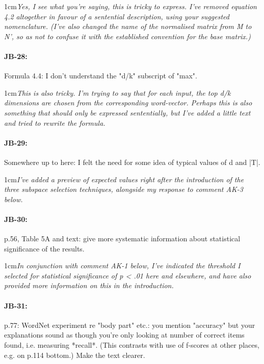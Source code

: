 \documentclass[11pt,a4paper]{article}
\newcommand{\res}[1]{\vspace{0.25cm} \begin{adjustwidth}{1cm}{}\emph{#1}\end{adjustwidth}}
\begin{document}
\res{Yes, I see what you're saying, this is tricky to express.  I've removed equation 4.2 altogether in favour of a sentential description, using your suggested nomenclature.  (I've also changed the name of the normalised matrix from M to N', so as not to confuse it with the established convention for the base matrix.)}

\paragraph{JB-28:} Formula 4.4: I don't understand the "d/k" subscript of "max".

\res{This is also tricky.  I'm trying to say that for each input, the top d/k dimensions are chosen from the corresponding word-vector.  Perhaps this is also something that should only be expressed sententially, but I've added a little text and tried to rewrite the formula.}

\paragraph{JB-29:} Somewhere up to here: I felt the need for some idea of typical values of d and |T|.

\res{I've added a preview of expected values right after the introduction of the three subspace selection techniques, alongside my response to comment AK-3 below.}

\paragraph{JB-30:} p.56, Table 5A and text: give more systematic information about statistical significance of the results.

\res{In conjunction with comment AK-1 below, I've indicated the threshold I selected for statistical significance of p < .01 here and elsewhere, and have also provided more information on this in the introduction.}

\paragraph{JB-31:} p.77: WordNet experiment re "body part" etc.: you mention "accuracy" but your explanations sound as though you're only looking at number of correct items found, i.e. measuring *recall*. (This contrasts with use of f-scores at other places, e.g. on p.114 bottom.) Make the text clearer.
\end{document}
